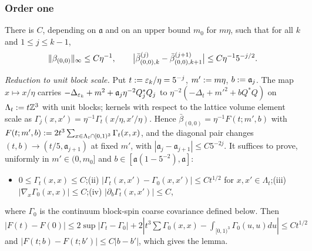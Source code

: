 \subsubsection{Order one}

\begin{lemma}\label{app:a04:lem:B0}
There is $C$, depending on $\mathfrak a$ and on an upper bound $m_0$ for $m\eta$, such that for all $k$ and $1\le j\le k-1$,
\[
\lVert \beta_{(0,0)}\rVert_\infty\le C\eta^{-1},\qquad\big|\bar\beta^{(j)}_{(0,0),k}-\bar\beta^{(j+1)}_{(0,0),k+1}\big|\le C\eta^{-1}5^{-j/2}.
\]
\end{lemma}

\noindent\emph{Reduction to unit block scale.} Put $t:=\varepsilon_k/\eta=5^{-j}$, $m':= m\eta$, $b:=\mathfrak a_j$. The map $x\mapsto x/\eta$ carries $-\Delta_{\varepsilon_k}+m^2+\mathfrak a_j\eta^{-2}Q_j^*Q_j$ to $\eta^{-2}(-\Delta_t+m'^2+bQ^*Q)$ on $\Lambda_t:= t\mathbb Z^3$ with unit blocks; kernels with respect to the lattice volume element scale as $\Gamma_j(x,x')=\eta^{-1}\Gamma_t(x/\eta,x'/\eta)$. Hence $\bar\beta_{(0,0)}=\eta^{-1}F(t;m',b)$ with $F(t;m',b):=2t^3\sum_{x\in\Lambda_t\cap[0,1)^3}\Gamma_t(x,x)$, and the diagonal pair changes $(t,b)\to(t/5,\mathfrak a_{j+1})$ at fixed $m'$, with $|\mathfrak a_j-\mathfrak a_{j+1}|\le C5^{-2j}$. It suffices to prove, uniformly in $m'\in(0,m_0]$ and $b\in[\mathfrak a(1-5^{-2}),\mathfrak a]$:
\begin{itemize}[leftmargin=2em]
\item[(i)] $0\le\Gamma_t(x,x)\le C$;\quad (ii) $|\Gamma_t(x,x')-\Gamma_0(x,x')|\le Ct^{1/2}$ for $x,x'\in\Lambda_t$;\quad (iii) $|\nabla_x\Gamma_0(x,x)|\le C$;\quad (iv) $|\partial_b\Gamma_t(x,x')|\le C$,
\end{itemize}
where $\Gamma_0$ is the continuum block-spin coarse covariance defined below. Then $|F(t)-F(0)|\le2\sup|\Gamma_t-\Gamma_0|+2|t^3\sum\Gamma_0(x,x)-\int_{[0,1)^3}\Gamma_0(u,u)du|\le Ct^{1/2}$ and $|F(t;b)-F(t;b')|\le C|b-b'|$, which gives the lemma.

